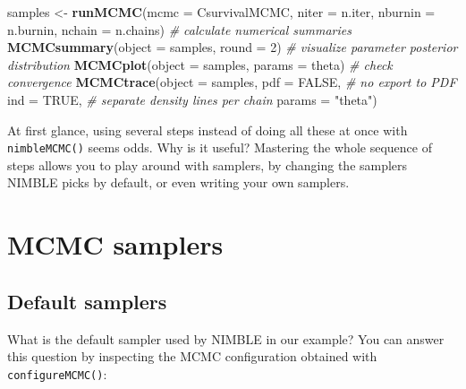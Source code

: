 \documentclass[
  12pt,
]{krantz}
\newenvironment{Shaded}{\begin{snugshade}}{\end{snugshade}}
\newcommand{\AttributeTok}[1]{\textcolor[rgb]{0.13,0.29,0.53}{#1}}
\newcommand{\CommentTok}[1]{\textcolor[rgb]{0.56,0.35,0.01}{\textit{#1}}}
\newcommand{\ConstantTok}[1]{\textcolor[rgb]{0.56,0.35,0.01}{#1}}
\newcommand{\DecValTok}[1]{\textcolor[rgb]{0.00,0.00,0.81}{#1}}
\newcommand{\DocumentationTok}[1]{\textcolor[rgb]{0.56,0.35,0.01}{\textbf{\textit{#1}}}}
\newcommand{\FunctionTok}[1]{\textcolor[rgb]{0.13,0.29,0.53}{\textbf{#1}}}
\newcommand{\NormalTok}[1]{#1}
\newcommand{\OtherTok}[1]{\textcolor[rgb]{0.56,0.35,0.01}{#1}}
\newcommand{\SpecialCharTok}[1]{\textcolor[rgb]{0.81,0.36,0.00}{\textbf{#1}}}
\newcommand{\StringTok}[1]{\textcolor[rgb]{0.31,0.60,0.02}{#1}}
\begin{document}
\begin{Shaded}
\begin{Highlighting}[]
\NormalTok{samples }\OtherTok{\textless{}{-}} \FunctionTok{runMCMC}\NormalTok{(}\AttributeTok{mcmc =}\NormalTok{ CsurvivalMCMC, }
                   \AttributeTok{niter =}\NormalTok{ n.iter,}
                   \AttributeTok{nburnin =}\NormalTok{ n.burnin,}
                   \AttributeTok{nchain =}\NormalTok{ n.chains)}
\CommentTok{\# calculate numerical summaries}
\FunctionTok{MCMCsummary}\NormalTok{(}\AttributeTok{object =}\NormalTok{ samples, }\AttributeTok{round =} \DecValTok{2}\NormalTok{)}
\CommentTok{\# visualize parameter posterior distribution}
\FunctionTok{MCMCplot}\NormalTok{(}\AttributeTok{object =}\NormalTok{ samples, }
         \AttributeTok{params =} \StringTok{\textquotesingle{}theta\textquotesingle{}}\NormalTok{)}
\CommentTok{\# check convergence}
\FunctionTok{MCMCtrace}\NormalTok{(}\AttributeTok{object =}\NormalTok{ samples,}
          \AttributeTok{pdf =} \ConstantTok{FALSE}\NormalTok{, }\CommentTok{\# no export to PDF}
          \AttributeTok{ind =} \ConstantTok{TRUE}\NormalTok{, }\CommentTok{\# separate density lines per chain}
          \AttributeTok{params =} \StringTok{"theta"}\NormalTok{)}
\end{Highlighting}
\end{Shaded}

At first glance, using several steps instead of doing all these at once with \texttt{nimbleMCMC()} seems odds. Why is it useful? Mastering the whole sequence of steps allows you to play around with samplers, by changing the samplers NIMBLE picks by default, or even writing your own samplers.

\hypertarget{mcmc-samplers}{%
\section{MCMC samplers}\label{mcmc-samplers}}

\hypertarget{change-sampler}{%
\subsection{Default samplers}\label{change-sampler}}

What is the default sampler used by NIMBLE in our example? You can answer this question by inspecting the MCMC configuration obtained with \texttt{configureMCMC()}:

\begin{Shaded}
\end{Shaded}
\end{document}
